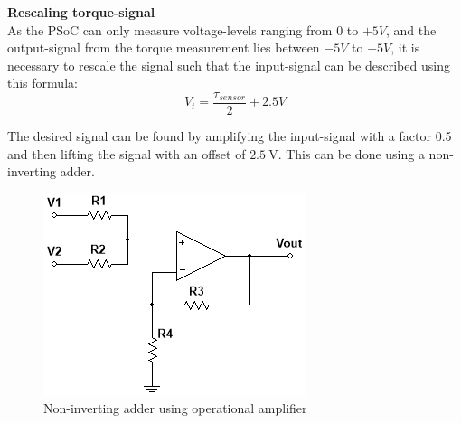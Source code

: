 \textbf{Rescaling torque-signal}\\
As the PSoC can only measure voltage-levels ranging from $0$ to $+5 V$, and the output-signal from the torque measurement lies between $-5 V$ to $+5 V$, it is necessary to rescale the signal such that the input-signal can be described using this formula:
\begin{equation}
	V_t = \frac{\tau_{sensor} }{2} + 2.5 V
\end{equation}

The desired signal can be found by amplifying the input-signal with a factor 0.5 and then lifting the signal with an offset of $\SI{2.5}{\volt}$. This can be done using a non-inverting adder.

\begin{figure}[H]
	\centering
	\includegraphics[width=0.4\linewidth]{Hardware/SignalConverter/TorqueDesign1}
	\caption{Non-inverting adder using operational amplifier}
	\label{fig:SignalConverterTorque1}
\end{figure}

